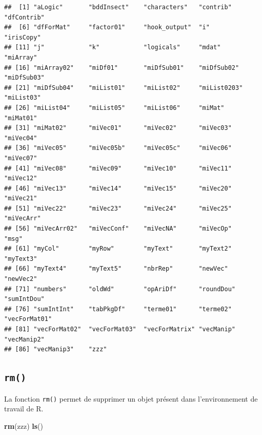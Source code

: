 \documentclass[
]{book}
\newenvironment{Shaded}{\begin{snugshade}}{\end{snugshade}}
\newcommand{\KeywordTok}[1]{\textcolor[rgb]{0.13,0.29,0.53}{\textbf{#1}}}
\newcommand{\NormalTok}[1]{#1}
\begin{document}
\begin{verbatim}
##  [1] "aLogic"       "bddInsect"    "characters"   "contrib"      "dfContrib"   
##  [6] "dfForMat"     "factor01"     "hook_output"  "i"            "irisCopy"    
## [11] "j"            "k"            "logicals"     "mdat"         "miArray"     
## [16] "miArray02"    "miDf01"       "miDfSub01"    "miDfSub02"    "miDfSub03"   
## [21] "miDfSub04"    "miList01"     "miList02"     "miList0203"   "miList03"    
## [26] "miList04"     "miList05"     "miList06"     "miMat"        "miMat01"     
## [31] "miMat02"      "miVec01"      "miVec02"      "miVec03"      "miVec04"     
## [36] "miVec05"      "miVec05b"     "miVec05c"     "miVec06"      "miVec07"     
## [41] "miVec08"      "miVec09"      "miVec10"      "miVec11"      "miVec12"     
## [46] "miVec13"      "miVec14"      "miVec15"      "miVec20"      "miVec21"     
## [51] "miVec22"      "miVec23"      "miVec24"      "miVec25"      "miVecArr"    
## [56] "miVecArr02"   "miVecConf"    "miVecNA"      "miVecOp"      "msg"         
## [61] "myCol"        "myRow"        "myText"       "myText2"      "myText3"     
## [66] "myText4"      "myText5"      "nbrRep"       "newVec"       "newVec2"     
## [71] "numbers"      "oldWd"        "opAriDf"      "roundDou"     "sumIntDou"   
## [76] "sumIntInt"    "tabPkgDf"     "terme01"      "terme02"      "vecForMat01" 
## [81] "vecForMat02"  "vecForMat03"  "vecForMatrix" "vecManip"     "vecManip2"   
## [86] "vecManip3"    "zzz"
\end{verbatim}

\hypertarget{l015rm}{%
\subsection{\texorpdfstring{\texttt{rm()}}{rm()}}\label{l015rm}}

La fonction \texttt{rm()} permet de supprimer un objet présent dans l'environnement de travail de R.

\begin{Shaded}
\begin{Highlighting}[]
\KeywordTok{rm}\NormalTok{(zzz)}
\KeywordTok{ls}\NormalTok{()}
\end{Highlighting}
\end{Shaded}
\end{document}
